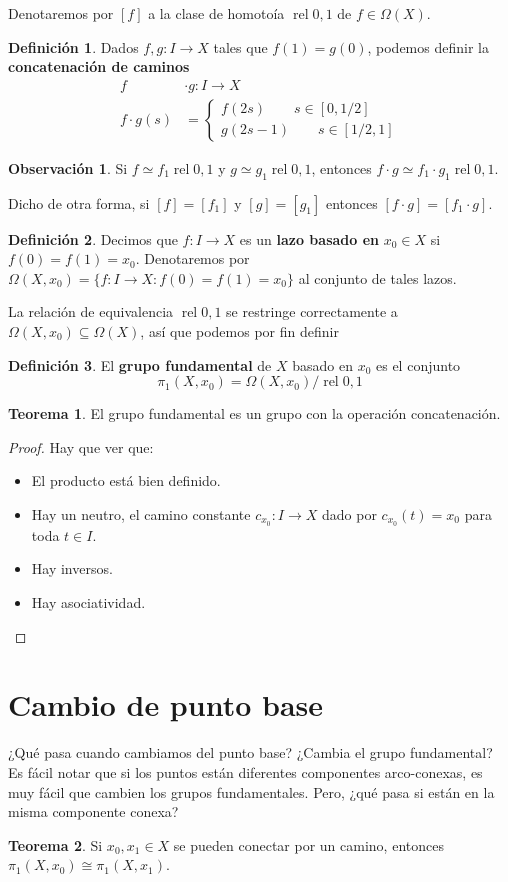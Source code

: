 \documentclass[spanish]{book}
\theoremstyle{definition}
\newtheorem*{defn}{Definición}
\newtheorem*{obs}{Observación}
\newtheorem*{teo}{Teorema}
\DeclareMathOperator{\rel}{rel}
\begin{document}
	Denotaremos por $[f]$ a la clase de homotoía $\rel0,1$ de $f\in\Omega(X)$.
	\begin{defn}
		Dados $f,g:I\to X$ tales que $f(1)=g(0)$, podemos definir la \textbf{concatenación de caminos}
		\begin{align*}
			f&\cdot g:I\to X\\
			f\cdot g(s)&=\begin{cases}
				f(2s)\qquad s\in[0,1/2]\\
				g(2s-1)\qquad s\in[1/2,1]
			\end{cases}
		\end{align*}
	\end{defn}
	\begin{obs}
		Si $f\simeq f_1\rel0,1$ y $g\simeq g_1\rel0,1$, entonces $f\cdot g\simeq f_1\cdot g_1\rel0,1$.
		
		Dicho de otra forma, si $[f]=[f_1]$ y $[g]=[g_1]$ entonces $[f\cdot g]=[f_1\cdot g]$.
	\end{obs}
	\begin{defn}
		Decimos que $f:I\to X$ es un \textbf{lazo basado en} $x_0\in X$ si $f(0)=f(1)=x_0$. Denotaremos por $\Omega(X,x_0)=\{f:I\to X:f(0)=f(1)=x_0\}$ al conjunto de tales lazos.
	\end{defn}
	La relación de equivalencia $\rel0,1$ se restringe correctamente a $\Omega(X,x_0)\subseteq\Omega(X)$, así que podemos por fin definir
	\begin{defn}
		El \textbf{grupo fundamental} de $X$ basado en $x_0$ es el conjunto
		\[\pi_1(X,x_0)=\Omega(X,x_0)/\rel0,1\]
	\end{defn}
	\begin{teo}
		El grupo fundamental es un grupo con la operación concatenación.
	\end{teo}
	\begin{proof}
		Hay que ver que:
		\begin{itemize}
			\item El producto está bien definido.
			\item Hay un neutro, el camino constante $c_{x_0}:I\to X$ dado por $c_{x_0}(t)=x_0$ para toda $t\in I$.
			\item Hay inversos.
			\item Hay asociatividad.
		\end{itemize}
	\end{proof}
\section{Cambio de punto base}
	¿Qué pasa cuando cambiamos del punto base? ¿Cambia el grupo fundamental? Es fácil notar que si los puntos están diferentes componentes arco-conexas, es muy fácil que cambien los grupos fundamentales. Pero, ¿qué pasa si están en la misma componente conexa?
	\begin{teo}
		Si $x_0,x_1\in X$ se pueden conectar por un camino, entonces $\pi_1(X,x_0)\cong\pi_1(X,x_1)$.
	\end{teo}
\end{document}
